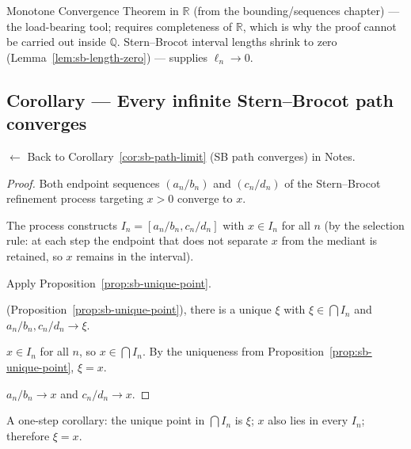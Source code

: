 \begin{remark*}[Dependencies]
Monotone Convergence Theorem in $\mathbb{R}$ (from the bounding/sequences
chapter) --- the load-bearing tool; requires completeness of $\mathbb{R}$,
which is why the proof cannot be carried out inside $\mathbb{Q}$.
Stern--Brocot interval lengths shrink to zero (Lemma~\ref{lem:sb-length-zero})
--- supplies $\ell_n \to 0$.
\end{remark*}



\subsection*{Corollary --- Every infinite Stern--Brocot path converges}
\label{prf:sb-path-limit}

\begin{remark*}[Return]
$\leftarrow$ Back to Corollary~\ref{cor:sb-path-limit} (SB path converges) in Notes.
\end{remark*}

\begin{proof}
\Claim Both endpoint sequences $(a_n/b_n)$ and $(c_n/d_n)$ of the
Stern--Brocot refinement process targeting $x > 0$ converge to $x$.

\Given The process constructs $I_n = [a_n/b_n, c_n/d_n]$ with $x \in I_n$
for all $n$ (by the selection rule: at each step the endpoint that does not
separate $x$ from the mediant is retained, so $x$ remains in the interval).

\Strategy Apply Proposition~\ref{prop:sb-unique-point}.

(Proposition~\ref{prop:sb-unique-point}), there is a unique $\xi$ with
$\xi \in \bigcap I_n$ and $a_n/b_n, c_n/d_n \to \xi$.

\ByAss $x \in I_n$ for all $n$, so $x \in \bigcap I_n$.
By the uniqueness from Proposition~\ref{prop:sb-unique-point}, $\xi = x$.

\Hence $a_n/b_n \to x$ and $c_n/d_n \to x$. \AsReq
\end{proof}

\begin{remark*}
A one-step corollary: the unique point in $\bigcap I_n$ is $\xi$;
$x$ also lies in every $I_n$; therefore $\xi = x$.
\end{remark*}

